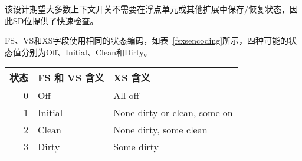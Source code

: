 \iffalse
\begin{commentary}
  The design anticipates that most context switches will not need to
  save/restore state in either or both of the floating-point unit or
  other extensions, so provides a fast check via the SD bit.
\end{commentary}
\fi

\begin{commentary}
该设计期望大多数上下文开关不需要在浮点单元或其他扩展中保存/恢复状态，因此SD位提供了快速检查。
\end{commentary}

\iffalse
The FS, VS, and XS fields use the same status encoding as shown in
Table~\ref{fsxsencoding}, with the four possible status values being
Off, Initial, Clean, and Dirty.
\fi

FS、VS和XS字段使用相同的状态编码，如表~\ref{fsxsencoding}所示，四种可能的状态值分别为Off、Initial、Clean和Dirty。


\begin{table*}[h!]
\begin{center}
\begin{tabular}{|r|l|l|}
\hline
状态  & FS 和 VS 含义 & XS 含义\\
\hline
0 & Off     &  All off \\
1 & Initial &  None dirty or clean, some on\\
2 & Clean   &  None dirty, some clean \\
3 & Dirty   &  Some dirty \\
\hline
\end{tabular}
\end{center}
\caption{FS[1:0]，VS[1:0]和 XS[1:0]状态字段表示。}
\label{fsxsencoding}
\end{table*}

